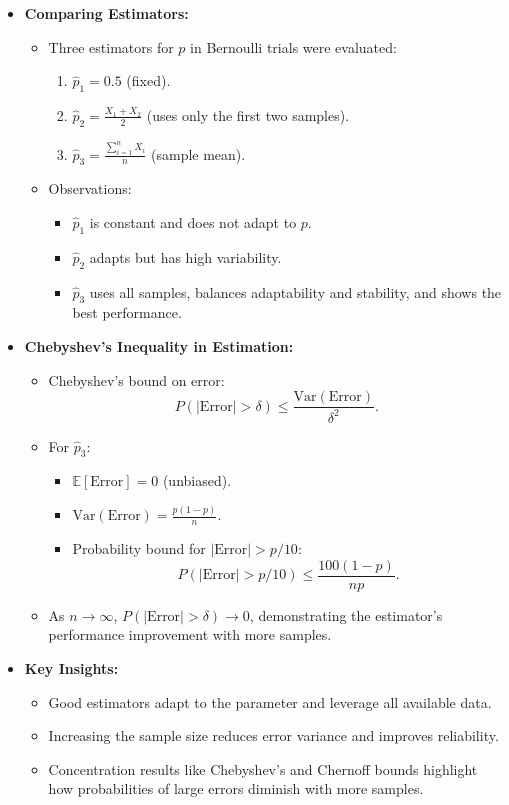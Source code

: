 \documentclass{article}
\begin{document}
\begin{itemize}
  \item \textbf{Comparing Estimators:}
    \begin{itemize}
      \item Three estimators for $p$ in Bernoulli trials were evaluated:
        \begin{enumerate}
          \item $\hat{p}_1 = 0.5$ (fixed).
          \item $\hat{p}_2 = \frac{X_1 + X_2}{2}$ (uses only the first two samples).
          \item $\hat{p}_3 = \frac{\sum_{i=1}^n X_i}{n}$ (sample mean).
        \end{enumerate}
      \item Observations:
        \begin{itemize}
          \item $\hat{p}_1$ is constant and does not adapt to $p$.
          \item $\hat{p}_2$ adapts but has high variability.
          \item $\hat{p}_3$ uses all samples, balances adaptability and stability, and shows the best performance.
        \end{itemize}
    \end{itemize}

  \item \textbf{Chebyshev's Inequality in Estimation:}
    \begin{itemize}
      \item Chebyshev's bound on error:
        \[
          P(|\text{Error}| > \delta) \leq \frac{\text{Var}(\text{Error})}{\delta^2}.
        \]
      \item For $\hat{p}_3$:
        \begin{itemize}
          \item $\mathbb{E}[\text{Error}] = 0$ (unbiased).
          \item $\text{Var}(\text{Error}) = \frac{p(1-p)}{n}$.
          \item Probability bound for $|\text{Error}| > p/10$:
            \[
              P(|\text{Error}| > p/10) \leq \frac{100(1-p)}{n p}.
            \]
        \end{itemize}
      \item As $n \to \infty$, $P(|\text{Error}| > \delta) \to 0$, demonstrating the estimator's performance improvement with more samples.
    \end{itemize}

  \item \textbf{Key Insights:}
    \begin{itemize}
      \item Good estimators adapt to the parameter and leverage all available data.
      \item Increasing the sample size reduces error variance and improves reliability.
      \item Concentration results like Chebyshev's and Chernoff bounds highlight how probabilities of large errors diminish with more samples.
    \end{itemize}
\end{itemize}
\end{document}
